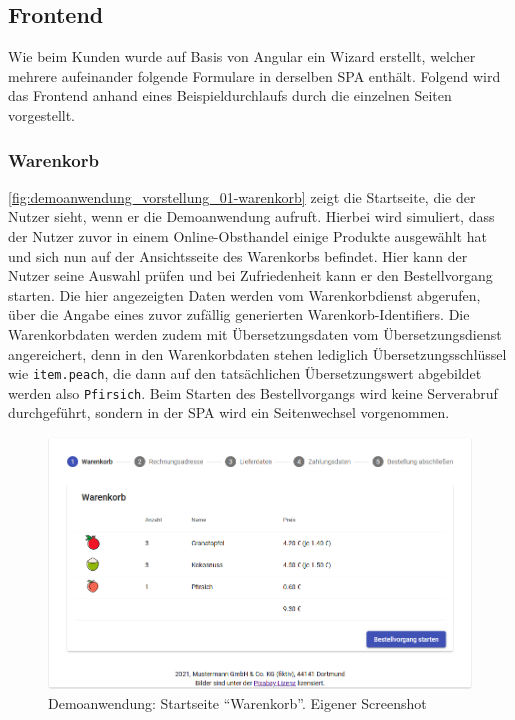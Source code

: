 \subsection{Frontend}

Wie beim Kunden wurde auf Basis von Angular ein Wizard erstellt, welcher mehrere aufeinander folgende Formulare in derselben SPA enthält. Folgend wird das Frontend anhand eines Beispieldurchlaufs durch die einzelnen Seiten vorgestellt.

\subsubsection{Warenkorb}

\autoref{fig:demoanwendung_vorstellung_01-warenkorb} zeigt die Startseite, die der Nutzer sieht, wenn er die Demoanwendung aufruft. Hierbei wird simuliert, dass der Nutzer zuvor in einem Online-Obsthandel einige Produkte ausgewählt hat und sich nun auf der Ansichtsseite des Warenkorbs befindet. Hier kann der Nutzer seine Auswahl prüfen und bei Zufriedenheit kann er den Bestellvorgang starten. Die hier angezeigten Daten werden vom Warenkorbdienst abgerufen, über die Angabe eines zuvor zufällig generierten Warenkorb-Identifiers. Die Warenkorbdaten werden zudem mit Übersetzungsdaten vom Übersetzungsdienst angereichert, denn in den Warenkorbdaten stehen lediglich Übersetzungsschlüssel wie \texttt{item.peach}, die dann auf den tatsächlichen Übersetzungswert abgebildet werden also \texttt{Pfirsich}. Beim Starten des Bestellvorgangs wird keine Serverabruf durchgeführt, sondern in der SPA wird ein Seitenwechsel vorgenommen.

\begin{figure}[H]
	\centering
	\includegraphics[width=1.00\linewidth]{img/04_erstellung-poc/demoanwendung_vorstellung_01-warenkorb.png}
	\caption{Demoanwendung: Startseite \enquote{Warenkorb}. Eigener Screenshot}
	\label{fig:demoanwendung_vorstellung_01-warenkorb}
\end{figure}

